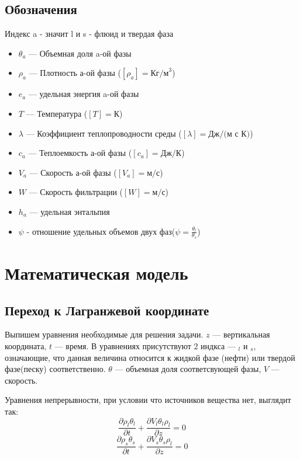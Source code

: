 \documentclass[12pt,a4paper]{article}
\newcommand{\pd}[2]{\frac{\partial #1}{\partial #2}}
\begin{document}
\subsection{Обозначения}
Индекс a - значит l и s - флюид и твердая фаза
\begin{itemize}
\item $\theta_a $ --- Объемная доля a-ой фазы
\item $\rho_a$ --- Плотность а-ой фазы ($[\rho_a] = \text{Кг/м}^3$)
\item $e_a$ --- удельная энергия a-ой фазы
\item $T $ --- Температура ($[T] =\text{К}$)
\item $\lambda$ --- Коэффициент теплопроводности среды ($[\lambda] = \text{Дж/(м с К)}$)
\item $c_a$ --- Теплоемкость а-ой фазы ($[c_a] = \text{Дж/К}$)
\item $V_a$ --- Скорость а-ой фазы ($[V_a] = \text{м/с} $)
\item $W$ --- Скорость фильтрации ($[W] = \text{м/с} $)
\item $h_a$ --- удельная энтальпия
\item $\psi$ - отношение удельных объемов двух фаз($\psi = \frac{\theta_l}{\theta_s} $)
\end{itemize}


\newpage
\section{Математическая модель}
\subsection{Переход к Лагранжевой координате}
Выпишем уравнения необходимые для решения задачи. $z$ --- вертикальная координата, $t$ --- время. В уравнениях присутствуют 2 индкса --- $ _l $ и $ _s$, означающие, что данная величина относится к жидкой фазе (нефти) или твердой фазе(песку) соответственно. $\theta$ --- объемная доля соответсвующей фазы, $ V $ --- скорость.

Уравнения непрерывности, при условии что источников вещества нет, выглядит так:
\begin{equation}
\pd{\rho_l\theta_l}{t} + \pd{V_l\theta_l\rho_l}{z} =0
\label{eq:contin_l}
\end{equation}
\begin{equation}
\pd{\rho_s\theta_s}{t} + \pd{V_s\theta_s\rho_l}{z} =0
\label{eq:contin_s}
\end{equation}
\end{document}
